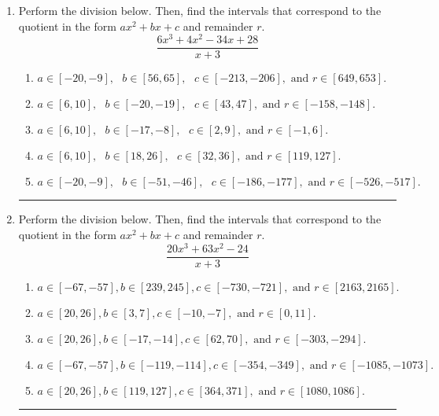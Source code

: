 \documentclass[14pt]{extbook}
\newcommand{\litem}[1]{\item#1\hspace*{-1cm}\rule{\textwidth}{0.4pt}}
\begin{document}
\begin{enumerate}
{\begin{enumerate}[label=\Alph*.]
\end{enumerate} }
\litem{
Perform the division below. Then, find the intervals that correspond to the quotient in the form $ax^2+bx+c$ and remainder $r$.\[ \frac{6x^{3} +4 x^{2} -34 x + 28}{x + 3} \]\begin{enumerate}[label=\Alph*.]
\item \( a \in [-20, -9], \text{   } b \in [56, 65], \text{   } c \in [-213, -206], \text{   and   } r \in [649, 653]. \)
\item \( a \in [6, 10], \text{   } b \in [-20, -19], \text{   } c \in [43, 47], \text{   and   } r \in [-158, -148]. \)
\item \( a \in [6, 10], \text{   } b \in [-17, -8], \text{   } c \in [2, 9], \text{   and   } r \in [-1, 6]. \)
\item \( a \in [6, 10], \text{   } b \in [18, 26], \text{   } c \in [32, 36], \text{   and   } r \in [119, 127]. \)
\item \( a \in [-20, -9], \text{   } b \in [-51, -46], \text{   } c \in [-186, -177], \text{   and   } r \in [-526, -517]. \)

\end{enumerate} }
\litem{
Perform the division below. Then, find the intervals that correspond to the quotient in the form $ax^2+bx+c$ and remainder $r$.\[ \frac{20x^{3} +63 x^{2} -24}{x + 3} \]\begin{enumerate}[label=\Alph*.]
\item \( a \in [-67, -57], b \in [239, 245], c \in [-730, -721], \text{ and } r \in [2163, 2165]. \)
\item \( a \in [20, 26], b \in [3, 7], c \in [-10, -7], \text{ and } r \in [0, 11]. \)
\item \( a \in [20, 26], b \in [-17, -14], c \in [62, 70], \text{ and } r \in [-303, -294]. \)
\item \( a \in [-67, -57], b \in [-119, -114], c \in [-354, -349], \text{ and } r \in [-1085, -1073]. \)
\item \( a \in [20, 26], b \in [119, 127], c \in [364, 371], \text{ and } r \in [1080, 1086]. \)

\end{enumerate} }
\end{enumerate}
\end{document}
